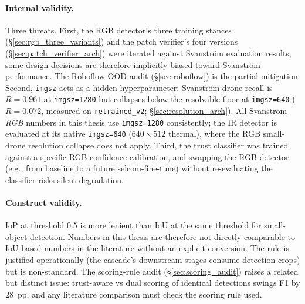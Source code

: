 \paragraph{Internal validity.}
Three threats. First, the RGB detector's three training stances (\S\ref{sec:rgb_three_variants}) and the patch verifier's four versions (\S\ref{sec:patch_verifier_arch}) were iterated against Svanstr\"om evaluation results; some design decisions are therefore implicitly biased toward Svanstr\"om performance. The Roboflow OOD audit (\S\ref{sec:roboflow}) is the partial mitigation. Second, \texttt{imgsz} acts as a hidden hyperparameter: Svanstr\"om drone recall is $R=0.961$ at \texttt{imgsz=1280} but collapses below the resolvable floor at \texttt{imgsz=640} ($R=0.072$, measured on \texttt{retrained\_v2}; \S\ref{sec:resolution_arch}). All Svanstr\"om \emph{RGB} numbers in this thesis use \texttt{imgsz=1280} consistently; the IR detector is evaluated at its native \texttt{imgsz=640} ($640{\times}512$ thermal), where the RGB small-drone resolution collapse does not apply. Third, the trust classifier was trained against a specific RGB confidence calibration, and swapping the RGB detector (e.g., from baseline to a future selcom-fine-tune) without re-evaluating the classifier risks silent degradation.

\paragraph{Construct validity.}
IoP at threshold 0.5 is more lenient than IoU at the same threshold for small-object detection. Numbers in this thesis are therefore not directly comparable to IoU-based numbers in the literature without an explicit conversion. The rule is justified operationally (the cascade's downstream stages consume detection crops) but is non-standard. The scoring-rule audit (\S\ref{sec:scoring_audit}) raises a related but distinct issue: trust-aware vs dual scoring of identical detections swings F1 by 28~pp, and any literature comparison must check the scoring rule used.

